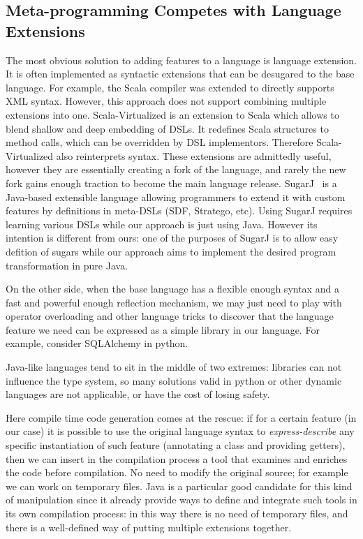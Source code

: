 \subsection{Meta-programming Competes with Language Extensions}
The most obvious solution to adding features to a language is language
extension. It is often implemented as syntactic extensions that can be desugared
to the base language. For example, the Scala compiler was extended to directly
supports XML syntax. However, this approach does not support combining multiple
extensions into one. Scala-Virtualized is an extension to Scala which allows to
blend shallow and deep embedding of DSLs. It redefines Scala structures to
method calls, which can be overridden by DSL implementors. Therefore
Scala-Virtualized also reinterprets syntax. These extensions are admittedly
useful, however they are essentially creating a fork of the language, and rarely
the new fork gains enough traction to become the main language release. %
SugarJ~\cite{erdweg11sugarj} is a Java-based extensible language allowing
programmers to extend it with custom features by definitions in meta-DSLs (SDF,
Stratego, etc). Using SugarJ requires learning various DSLs while our approach
is just using Java. However its intention is different from ours: one of the
purposes of SugarJ is to allow easy defition of sugars while our approach aims to
implement the desired program transformation in pure Java.

On the other side, when the base language has a flexible enough syntax and
a fast and powerful enough reflection mechanism, we may just need to play with
operator overloading and other language tricks to discover that the language
feature we need can be expressed as a simple library in our language. For
example, consider SQLAlchemy in python.

Java-like languages tend to sit in the middle of two extremes: libraries
can not influence the type system, so many solutions valid in python or other dynamic
languages are not applicable, or have the cost of losing
safety.

Here compile time code generation comes at the rescue: if for a certain feature
(\mixin in our case) it is possible to use the original language syntax to
\emph{express-describe} any specific instantiation of such feature (annotating a
class and providing getters), then we can insert in the compilation process a tool
that examines and enriches the code before compilation. No need to modify the
original source; for example we can work on temporary files. Java is a particular
good candidate for this kind of manipulation since it already provide ways to
define and integrate such tools in its own compilation process: in this way
there is no need of temporary files, and there is a well-defined way of putting
multiple extensions together.


